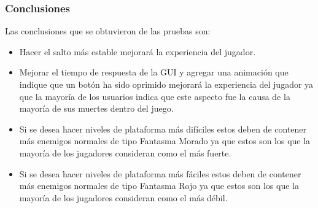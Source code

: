 \subsubsection{Conclusiones}
Las conclusiones que se obtuvieron de las pruebas son:
    \begin{itemize}
        \item Hacer el salto más estable mejorará la experiencia del jugador.
        \item Mejorar el tiempo de respuesta de la GUI y agregar una animación
        que indique que un botón ha sido oprimido mejorará la experiencia del
        jugador ya que la mayoría de los usuarios indica que este aspecto fue la
        causa de la mayoría de sus muertes dentro del juego.
        \item Si se desea hacer niveles de plataforma más difíciles estos deben
        de contener más enemigos normales de tipo Fantasma Morado ya que estos son
        los que la mayoría de los jugadores consideran como el más fuerte.
        \item Si se desea hacer niveles de plataforma más fáciles estos deben
        de contener más enemigos normales de tipo Fantasma Rojo ya que estos son los
        que la mayoría de los jugadores consideran como el más débil.
    \end{itemize}